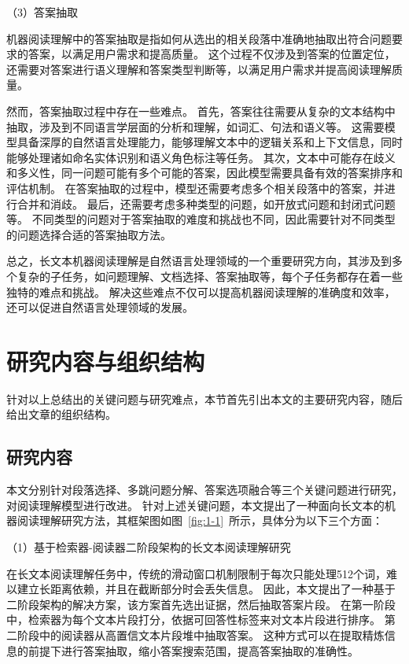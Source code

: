 （3）答案抽取

机器阅读理解中的答案抽取是指如何从选出的相关段落中准确地抽取出符合问题要求的答案，以满足用户需求和提高质量。
这个过程不仅涉及到答案的位置定位，还需要对答案进行语义理解和答案类型判断等\cite{Zhou2021AnOD}，以满足用户需求并提高阅读理解质量。

然而，答案抽取过程中存在一些难点。
首先，答案往往需要从复杂的文本结构中抽取，涉及到不同语言学层面的分析和理解，如词汇、句法和语义等\cite{Sordoni2015ANN,Moschitti2008KernelsOL,Thomas2022AnAH}。
这需要模型具备深厚的自然语言处理能力，能够理解文本中的逻辑关系和上下文信息，同时能够处理诸如命名实体识别和语义角色标注等任务\cite{Shi2019SimpleBM,Lample2016NeuralAF}。
其次，文本中可能存在歧义和多义性，同一问题可能有多个可能的答案，因此模型需要具备有效的答案排序和评估机制\cite{cui-etal-2020-multi}。
在答案抽取的过程中，模型还需要考虑多个相关段落中的答案，并进行合并和消歧。
最后，还需要考虑多种类型的问题，如开放式问题和封闭式问题等。
不同类型的问题对于答案抽取的难度和挑战也不同，因此需要针对不同类型的问题选择合适的答案抽取方法\cite{Zhang2016QuestionAO}。

总之，长文本机器阅读理解是自然语言处理领域的一个重要研究方向，其涉及到多个复杂的子任务，如问题理解、文档选择、答案抽取等，每个子任务都存在着一些独特的难点和挑战。
解决这些难点不仅可以提高机器阅读理解的准确度和效率，还可以促进自然语言处理领域的发展。


\section{研究内容与组织结构}
针对以上总结出的关键问题与研究难点，本节首先引出本文的主要研究内容，随后给出文章的组织结构。

\subsection{研究内容}



本文分别针对段落选择、多跳问题分解、答案选项融合等三个关键问题进行研究，对阅读理解模型进行改进。
针对上述关键问题，本文提出了一种面向长文本的机器阅读理解研究方法，其框架图如图~\ref{fig:1-1}~所示，具体分为以下三个方面：

（1）基于检索器-阅读器二阶段架构的长文本阅读理解研究

在长文本阅读理解任务中，传统的滑动窗口机制限制于每次只能处理512个词，难以建立长距离依赖，并且在截断部分时会丢失信息。
因此，本文提出了一种基于二阶段架构的解决方案，该方案首先选出证据，然后抽取答案片段。
在第一阶段中，检索器为每个文本片段打分，依据可回答性标签来对文本片段进行排序。
第二阶段中的阅读器从高置信文本片段堆中抽取答案。
这种方式可以在提取精炼信息的前提下进行答案抽取，缩小答案搜索范围，提高答案抽取的准确性。

